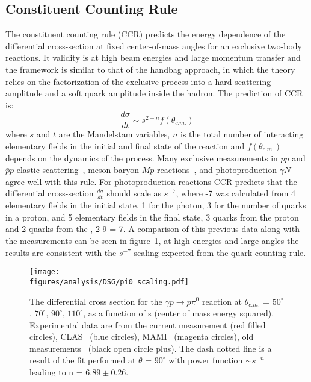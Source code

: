 \subsection{Constituent Counting Rule}
The constituent counting rule (CCR) predicts the energy dependence of the differential cross-section at fixed center-of-mass angles for an exclusive two-body reactions. It validity is at high beam energies and large momentum transfer and the framework is similar to that of the handbag approach, in which the theory relies on the factorization of the exclusive process into a hard scattering amplitude and a soft quark amplitude inside the hadron. The prediction of CCR is:
\begin{equation}
\frac{d\sigma}{dt} \sim s^{2-n}f(\theta_{c.m.}) \label{CCR}
\end{equation}
where $s$ and $t$ are the Mandelstam variables, $n$ is the total number of interacting elementary fields in the initial and final state of the reaction and $f(\theta_{c.m.})$ depends on the dynamics of the process. Many exclusive measurements in $pp$ and  $\bar{p}p$ elastic scattering~\cite{scalingexp5, scalingexp7}, meson-baryon $M p$ reactions~\cite{scalingexp7}, and photoproduction $\gamma N$~\cite{scalingexp2, scalingexp3, scalingexp4, scalingexp6, scalingexp8, scalingexp9, scalingexp10, scalingexp11} agree well with this rule. For \piz photoproduction reactions CCR predicts that the differential cross-section $\frac{d\sigma}{dt}$ should scale as $s^{-7}$, where -7 was calculated from 4 elementary fields in the initial state, 1 for the photon, 3 for the number of quarks in a proton, and 5 elementary fields in the final state, 3 quarks from the proton and  2 quarks from the \piz, 2-9 =-7. A comparison of this previous data along with the  measurements can be seen in figure~\ref{fig:pi0_scaling}, at high energies and large angles the results are consistent with the $s^{−7}$ scaling expected from the quark counting rule. 
\begin{figure}[h]
	\centerline{\texttt{[image: \\figures/analysis/DSG/pi0\_scaling.pdf]}}
	\caption{The differential cross section for the $\gamma p \to p \pi^0$ reaction at $\theta_{c.m.}$ = $50^{\circ}$, $70^{\circ}$, $90^{\circ}$, $110^{\circ}$, as a function of s (center of mass energy squared). Experimental data are from the current measurement (red filled circles), CLAS~\protect\cite{Dugger07,Dugger13} (blue circles), MAMI~\protect\cite{beck} (magenta circles), old measurements~\protect\cite{Joos} (black open circle plus). The dash dotted line is a result of the fit performed at $\theta$ = $90^{\circ}$ with power function $\sim s^{−n}$ leading to n = $6.89 \pm 0.26$.}
	\label{fig:pi0_scaling}
\end{figure}